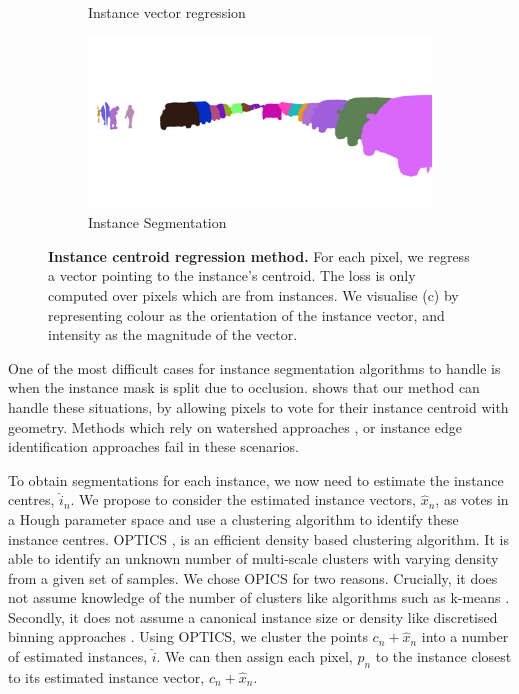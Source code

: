 \begin{figure}[t]
\begin{center}
\begin{subfigure}[t]{0.48\linewidth}
  \caption{Instance vector regression}
\end{subfigure}
\begin{subfigure}[t]{0.48\linewidth}
  \includegraphics[width=\linewidth]{example_instance/bielefeld_000000_001011_instance_segmentation.png}
  \caption{Instance Segmentation}
\end{subfigure}
\end{center}
   \caption[Instance centroid regression method.]{\textbf{Instance centroid regression method.} For each pixel, we regress a vector pointing to the instance's centroid. The loss is only computed over pixels which are from instances. We visualise (c) by representing colour as the orientation of the instance vector, and intensity as the magnitude of the vector.}
\label{fig:instance}
\end{figure}

One of the most difficult cases for instance segmentation algorithms to handle is when the instance mask is split due to occlusion.  shows that our method can handle these situations, by allowing pixels to vote for their instance centroid with geometry. Methods which rely on watershed approaches \cite{bai2016deep}, or instance edge identification approaches fail in these scenarios.

To obtain segmentations for each instance, we now need to estimate the instance centres, $\hat{i}_n$. We propose to consider the estimated instance vectors, $\hat{x}_n$, as votes in a Hough parameter space and use a clustering algorithm to identify these instance centres. OPTICS \cite{ankerst1999optics}, is an efficient density based clustering algorithm. It is able to identify an unknown number of multi-scale clusters with varying density from a given set of samples. We chose OPICS for two reasons. Crucially, it does not assume knowledge of the number of clusters like algorithms such as k-means \cite{macqueen1967some}. Secondly, it does not assume a canonical instance size or density like discretised binning approaches \cite{comaniciu2002mean}. Using OPTICS, we cluster the points $c_n+\hat{x}_n$ into a number of estimated instances, $\hat{i}$. We can then assign each pixel, $p_n$ to the instance closest to its estimated instance vector, $c_n+\hat{x}_n$.

